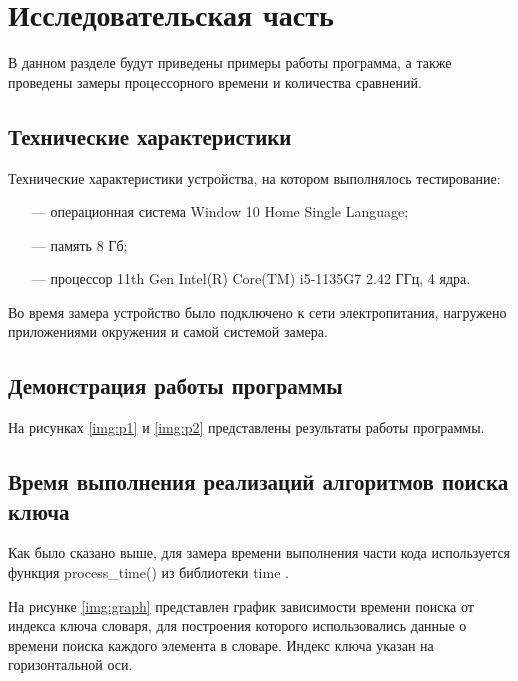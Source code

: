 \chapter{Исследовательская часть}
В данном разделе будут приведены примеры работы программа, а также проведены замеры процессорного времени и количества сравнений.

\section{Технические характеристики}

Технические характеристики устройства, на котором выполнялось тестирование:

\begin{itemize}
	\item[---] операционная система Window 10 Home Single Language;
	\item[---] память 8 Гб;
	\item[---] процессор 11th Gen Intel(R) Core(TM) i5-1135G7 2.42 ГГц, 4 ядра.
\end{itemize}

Во время замера устройство было подключено к сети электропитания, нагружено приложениями окружения и самой системой замера.


\section{Демонстрация работы программы}

На рисунках \ref{img:p1} и \ref{img:p2} представлены результаты работы программы.


\section{Время выполнения реализаций алгоритмов поиска ключа}
Как было сказано выше, для замера времени выполнения части кода используется функция process\_time() из библиотеки time \cite{pythonlangtime}. 

На рисунке \ref{img:graph} представлен график зависимости времени поиска от
индекса ключа словаря, для построения которого использовались данные
о времени поиска каждого элемента в словаре. Индекс ключа
указан на горизонтальной оси.


